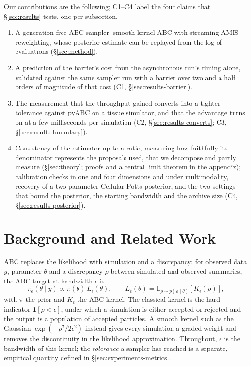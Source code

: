 \documentclass[10pt]{article}
\theoremstyle{plain}
\theoremstyle{definition}
\begin{document}
Our contributions are the following; C1--C4 label the four claims that \S\ref{sec:results} tests, one per subsection.
\begin{enumerate}
\item A generation-free ABC sampler, smooth-kernel ABC with streaming AMIS reweighting, whose posterior estimate can be replayed from the log of evaluations (\S\ref{sec:method}).
\item A prediction of the barrier's cost from the asynchronous run's timing alone, validated against the same sampler run with a barrier over two and a half orders of magnitude of that cost (C1, \S\ref{sec:results-barrier}).
\item The measurement that the throughput gained converts into a tighter tolerance against pyABC on a tissue simulator, and that the advantage turns on at a few milliseconds per simulation (C2, \S\ref{sec:results-converts}; C3, \S\ref{sec:results-boundary}).
\item Consistency of the estimator up to a ratio, measuring how faithfully its denominator represents the proposals used, that we decompose and partly measure (\S\ref{sec:theory}; proofs and a central limit theorem in the appendix); calibration checks in one and four dimensions and under multimodality, recovery of a two-parameter Cellular Potts posterior, and the two settings that bound the posterior, the starting bandwidth and the archive size (C4, \S\ref{sec:results-posterior}).
\end{enumerate}

\section{Background and Related Work}\label{sec:background}\label{sec:background-abc}\label{sec:background-sequential}\label{sec:background-amis}\label{sec:background-distributed}
ABC replaces the likelihood with simulation and a discrepancy: for observed data $y$, parameter $\theta$ and a discrepancy $\rho$ between simulated and observed summaries, the ABC target at bandwidth $\epsilon$ is
\begin{equation}
\pi_{\epsilon}(\theta \mid y) \propto \pi(\theta)\, L_{\epsilon}(\theta),
\qquad
L_{\epsilon}(\theta) = \mathbb{E}_{\rho \sim p(\rho \mid \theta)}\!\left[K_{\epsilon}(\rho)\right],
\label{eq:abc-target}
\end{equation}
with $\pi$ the prior and $K_\epsilon$ the ABC kernel. The classical kernel is the hard indicator $\mathbf{1}[\rho<\epsilon]$, under which a simulation is either accepted or rejected and the output is a population of accepted particles. A smooth kernel such as the Gaussian $\exp(-\rho^2/2\epsilon^2)$ \citep{wilkinson2013,fearnhead2012} instead gives every simulation a graded weight and removes the discontinuity in the likelihood approximation. Throughout, $\epsilon$ is the bandwidth of this kernel; the \emph{tolerance} a sampler has reached is a separate, empirical quantity defined in \S\ref{sec:experiments-metrics}.
\end{document}
